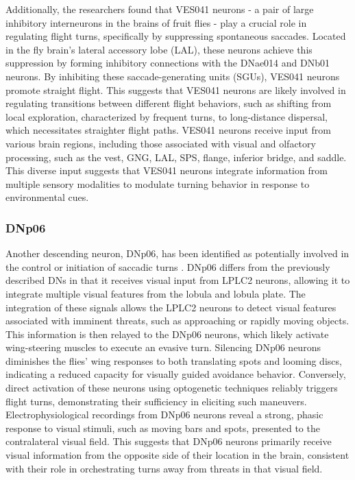 \documentclass[../main/thesis_msc.tex]{subfiles}
\begin{document}
	Additionally, the researchers found that VES041 neurons - a pair of large inhibitory interneurons in the brains of fruit flies - play a crucial role in regulating flight turns, specifically by suppressing spontaneous saccades. Located in the fly brain's lateral accessory lobe (LAL), these neurons achieve this suppression by forming inhibitory connections with the DNae014 and DNb01 neurons. By inhibiting these saccade-generating units (SGUs), VES041 neurons promote straight flight. This suggests that VES041 neurons are likely involved in regulating transitions between different flight behaviors, such as shifting from local exploration, characterized by frequent turns, to long-distance dispersal, which necessitates straighter flight paths. VES041 neurons receive input from various brain regions, including those associated with visual and olfactory processing, such as the vest, GNG, LAL, SPS, flange, inferior bridge, and saddle. This diverse input suggests that VES041 neurons integrate information from multiple sensory modalities to modulate turning behavior in response to environmental cues.

	\subsubsection{DNp06}

	Another descending neuron, DNp06, has been identified as potentially involved in the control or initiation of saccadic turns \autocite{kim_visuomotor_2023}. DNp06 differs from the previously described DNs in that it receives visual input from LPLC2 neurons, allowing it to integrate multiple visual features from the lobula and lobula plate. The integration of these signals allows the LPLC2 neurons to detect visual features associated with imminent threats, such as approaching or rapidly moving objects. This information is then relayed to the DNp06 neurons, which likely activate wing-steering muscles to execute an evasive turn. Silencing DNp06 neurons diminishes the flies' wing responses to both translating spots and looming discs, indicating a reduced capacity for visually guided avoidance behavior. Conversely, direct activation of these neurons using optogenetic techniques reliably triggers flight turns, demonstrating their sufficiency in eliciting such maneuvers. Electrophysiological recordings from DNp06 neurons reveal a strong, phasic response to visual stimuli, such as moving bars and spots, presented to the contralateral visual field. This suggests that DNp06 neurons primarily receive visual information from the opposite side of their location in the brain, consistent with their role in orchestrating turns away from threats in that visual field.
\end{document}
